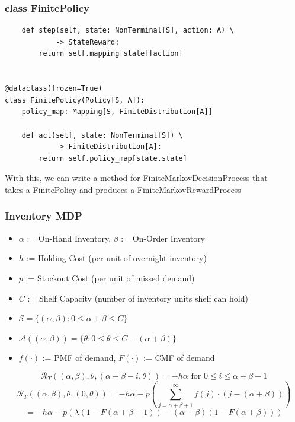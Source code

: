 \documentclass[handout]{beamer}
\begin{document}
\begin{frame}[fragile]
\frametitle{class FinitePolicy}
\pause
\begin{lstlisting}
    def step(self, state: NonTerminal[S], action: A) \
            -> StateReward:
        return self.mapping[state][action]             
        
        
@dataclass(frozen=True)
class FinitePolicy(Policy[S, A]):
    policy_map: Mapping[S, FiniteDistribution[A]]

    def act(self, state: NonTerminal[S]) \
            -> FiniteDistribution[A]:
        return self.policy_map[state.state]                           
\end{lstlisting}

With this, we can write a method for FiniteMarkovDecisionProcess that \\
takes a FinitePolicy and produces a FiniteMarkovRewardProcess                                 
\end{frame}

\begin{frame}
\frametitle{Inventory MDP}
\pause
\begin{itemize}[<+->]
\item $\alpha$ := On-Hand Inventory, $\beta$ := On-Order Inventory
\item $h$ := Holding Cost (per unit of overnight inventory)
\item $p$ := Stockout Cost (per unit of missed demand)
\item $C$ := Shelf Capacity (number of inventory units shelf can hold)
\item $\mathcal{S} = \{(\alpha, \beta) : 0 \leq \alpha + \beta \leq C\}$
\item $\mathcal{A}((\alpha, \beta)) = \{\theta : 0 \leq \theta \leq C - (\alpha + \beta)\}$
\item $f(\cdot)$ := PMF of demand, $F(\cdot)$ := CMF of demand
\end{itemize}
\pause
$$\mathcal{R}_T((\alpha, \beta), \theta, (\alpha + \beta - i, \theta)) = - h \alpha \text{ for } 0 \leq i \leq \alpha + \beta - 1$$
\pause
$$\mathcal{R}_T((\alpha, \beta), \theta, (0, \theta)) = - h \alpha - p (\sum_{j=\alpha+\beta+1}^{\infty} f(j) \cdot (j - (\alpha + \beta)))$$
 $$= - h \alpha - p (\lambda (1 - F(\alpha + \beta - 1)) -  (\alpha + \beta)(1 - F(\alpha + \beta)))$$ 
\end{frame}
\end{document}
